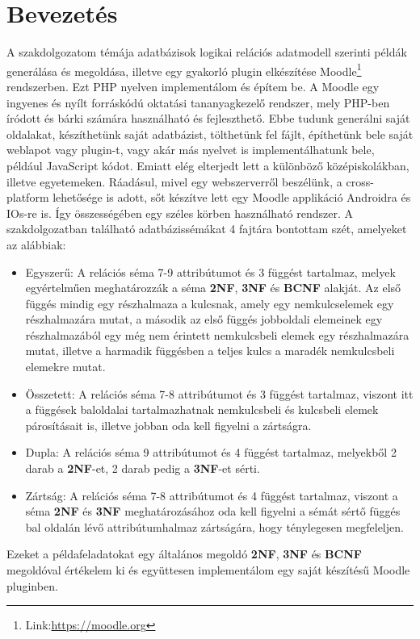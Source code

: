\chapter*{Bevezetés}
A szakdolgozatom témája adatbázisok logikai relációs adatmodell szerinti példák generálása és megoldása, illetve egy gyakorló plugin elkészítése Moodle\footnote{Link:\href{https://moodle.org}{https://moodle.org}} rendszerben. Ezt PHP nyelven implementálom és építem be. A Moodle egy ingyenes és nyílt forráskódú oktatási tananyagkezelő rendszer, mely PHP-ben íródott és bárki számára használható és fejleszthető. Ebbe tudunk generálni saját oldalakat, készíthetünk saját adatbázist, tölthetünk fel fájlt, építhetünk bele saját weblapot vagy plugin-t, vagy akár más nyelvet is implementálhatunk bele, például JavaScript kódot. Emiatt elég elterjedt lett a különböző középiskolákban, illetve egyetemeken. Ráadásul, mivel egy webszerverről beszélünk, a cross-platform lehetősége is adott, sőt készítve lett egy Moodle applikáció Androidra és IOs-re is. Így összességében egy széles körben használható rendszer. \hfill \newline
A szakdolgozatban található adatbázissémákat 4 fajtára bontottam szét, amelyeket az alábbiak:\hfill \newline
\begin{itemize}
    \item Egyszerű: A relációs séma 7-9 attribútumot és 3 függést tartalmaz, melyek egyértelműen meghatározzák a séma \textbf{2NF}, \textbf{3NF} és \textbf{BCNF} alakját. Az első függés mindig egy részhalmaza a kulcsnak, amely egy nemkulcselemek egy részhalmazára mutat, a második az első függés jobboldali elemeinek egy részhalmazából egy még nem érintett nemkulcsbeli elemek egy részhalmazára mutat, illetve a harmadik függésben a teljes kulcs a maradék nemkulcsbeli elemekre mutat.
    \item Összetett: A relációs séma 7-8 attribútumot és 3 függést tartalmaz, viszont itt a függések baloldalai tartalmazhatnak nemkulcsbeli és kulcsbeli elemek párosításait is, illetve jobban oda kell figyelni a zártságra.
    \item Dupla: A relációs séma 9 attribútumot és 4 függést tartalmaz, melyekből 2 darab a \textbf{2NF}-et, 2 darab pedig a \textbf{3NF}-et sérti.
    \item Zártság: A relációs séma 7-8 attribútumot és 4 függést tartalmaz, viszont a séma \textbf{2NF} és \textbf{3NF} meghatározásához oda kell figyelni a sémát sértő függés bal oldalán lévő attribútumhalmaz zártságára, hogy ténylegesen megfeleljen.
\end{itemize}
Ezeket a példafeladatokat egy általános megoldó \textbf{2NF}, \textbf{3NF} és \textbf{BCNF} megoldóval értékelem ki és együttesen implementálom egy saját készítésű Moodle pluginben.\hfill \newline


